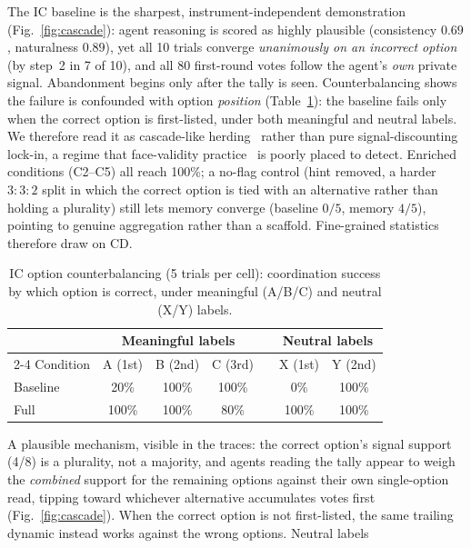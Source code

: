 \documentclass[runningheads]{llncs}
\begin{document}
The IC baseline is the sharpest, instrument-independent demonstration (Fig.~\ref{fig:cascade}): agent reasoning is scored as highly plausible (consistency $0.69$, naturalness $0.89$), yet all 10 trials converge \emph{unanimously on an incorrect option} (by step~2 in 7 of 10), and all 80 first-round votes follow the agent's \emph{own} private signal. Abandonment begins only after the tally is seen. Counterbalancing shows the failure is confounded with option \emph{position} (Table~\ref{tab:counterbal}): the baseline fails only when the correct option is first-listed, under both meaningful and neutral labels. We therefore read it as cascade-like herding~\cite{bikhchandani1992theory,cho2025herd,aharon2026tacit} rather than pure signal-discounting lock-in, a regime that face-validity practice~\cite{kluegl2008validation,larooij2025critical,zeng2026uncanny} is poorly placed to detect. Enriched conditions (C2--C5) all reach 100\%; a no-flag control (hint removed, a harder $3{:}3{:}2$ split in which the correct option is tied with an alternative rather than holding a plurality) still lets memory converge (baseline $0/5$, memory $4/5$), pointing to genuine aggregation rather than a scaffold. Fine-grained statistics therefore draw on CD.
\begin{table}[t]
\centering
\caption{IC option counterbalancing (5 trials per cell): coordination success by which option is correct, under meaningful (A/B/C) and neutral (X/Y) labels.}
\label{tab:counterbal}
\small
\setlength{\tabcolsep}{6pt}
\begin{tabular}{l ccc c cc}
\toprule
 & \multicolumn{3}{c}{Meaningful labels} & & \multicolumn{2}{c}{Neutral labels} \\
\cmidrule{2-4}\cmidrule{6-7}
Condition & A (1st) & B (2nd) & C (3rd) & & X (1st) & Y (2nd) \\
\midrule
Baseline & 20\% & 100\% & 100\% & & 0\% & 100\% \\
Full & 100\% & 100\% & 80\% & & 100\% & 100\% \\
\bottomrule
\end{tabular}
\end{table}
A plausible mechanism, visible in the traces: the correct option's signal support (4/8) is a
plurality, not a majority, and agents reading the tally appear to weigh the \emph{combined} support
for the remaining options against their own single-option read, tipping toward whichever
alternative accumulates votes first (Fig.~\ref{fig:cascade}). When the correct option is not
first-listed, the same trailing dynamic instead works against the wrong options. Neutral labels
\end{document}
